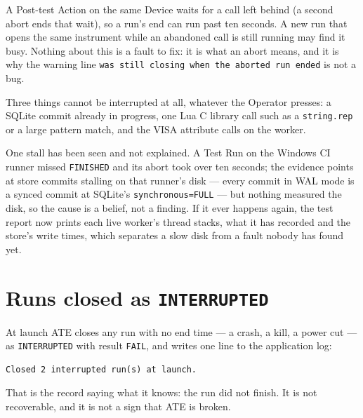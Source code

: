 A Post-test Action on the same Device waits for a call left behind (a second abort ends that wait),
so a run's end can run past ten seconds. A new run that opens the same instrument while an abandoned
call is still running may find it busy. Nothing about this is a fault to fix: it is what an abort
means, and it is why the warning line \texttt{was still closing when the aborted run ended} is not a
bug.

Three things cannot be interrupted at all, whatever the Operator presses: a SQLite commit already in
progress, one Lua C library call such as a \texttt{string.rep} or a large pattern match, and the
VISA attribute calls on the worker.

One stall has been seen and not explained. A Test Run on the Windows CI runner missed \texttt{FINISHED}
and its abort took over ten seconds; the evidence points at store commits stalling on that runner's
disk --- every commit in WAL mode is a synced commit at SQLite's \texttt{synchronous=FULL} --- but
nothing measured the disk, so the cause is a belief, not a finding. If it ever happens again, the
test report now prints each live worker's thread stacks, what it has recorded and the store's write
times, which separates a slow disk from a fault nobody has found yet.

\section{Runs closed as \texttt{INTERRUPTED}}

At launch ATE closes any run with no end time --- a crash, a kill, a power cut --- as
\texttt{INTERRUPTED} with result \texttt{FAIL}, and writes one line to the application log:

\begin{lstlisting}[language=ATEShell]
Closed 2 interrupted run(s) at launch.
\end{lstlisting}

That is the record saying what it knows: the run did not finish. It is not recoverable, and it is
not a sign that ATE is broken.

